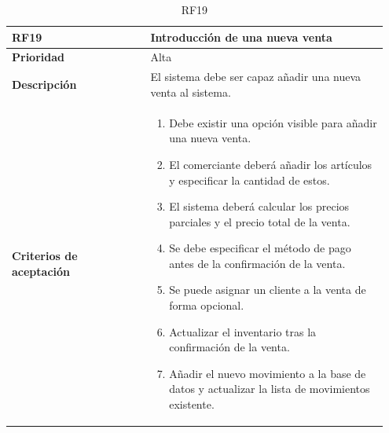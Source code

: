 \begin{table}[H]
	\centering %
	\begin{tabular}{|p{0.35\linewidth}|p{0.6\linewidth}|}
		\hline
		\rowcolor{grayshade} \textbf{RF19} & \textbf{Introducción de una nueva venta} \\
		\hline
		\textbf{Prioridad} & Alta \\
		\hline
		\textbf{Descripción} & El sistema debe ser capaz añadir una nueva venta al sistema.\\
		\hline
		\vspace{0.5mm}
		\textbf{Criterios de aceptación} & 
		\begin{minipage}[t]{0.9\linewidth}
			\begin{enumerate}
				\item Debe existir una opción visible para añadir una nueva venta.
				\item El comerciante deberá añadir los artículos y especificar la cantidad de estos.  
				\item El sistema deberá calcular los precios parciales y el precio total de la venta. 
				\item Se debe especificar el método de pago antes de la confirmación de la venta. 
				\item Se puede asignar un cliente a la venta de forma opcional. 
				\item Actualizar el inventario tras la confirmación de la venta. 
				\item Añadir el nuevo movimiento a la base de datos y actualizar la lista de movimientos existente.  
			\end{enumerate}
			\vspace{2mm}
		\end{minipage} \\
		\hline
	\end{tabular}
	\caption{RF19}
\end{table}


